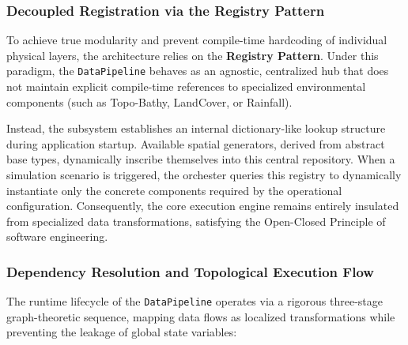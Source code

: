 \subsubsection{Decoupled Registration via the Registry Pattern}
\label{subsub:registry_pattern}

To achieve true modularity and prevent compile-time hardcoding of individual physical layers, the architecture relies on the 
\textbf{Registry Pattern}. Under this paradigm, the \texttt{DataPipeline} behaves as an agnostic, centralized hub that does not maintain 
explicit compile-time references to specialized environmental components (such as Topo-Bathy, LandCover, or Rainfall).

Instead, the subsystem establishes an internal dictionary-like lookup structure during application startup. Available spatial generators, 
derived from abstract base types, dynamically inscribe themselves into this central repository. When a simulation scenario is triggered, 
the orchester queries this registry to dynamically instantiate only the concrete components required by the operational configuration. 
Consequently, the core execution engine remains entirely insulated from specialized data transformations, satisfying the Open-Closed 
Principle of software engineering.

\subsubsection{Dependency Resolution and Topological Execution Flow}
\label{subsub:topological_execution}

The runtime lifecycle of the \texttt{DataPipeline} operates via a rigorous three-stage graph-theoretic sequence, mapping data flows as 
localized transformations while preventing the leakage of global state variables:

